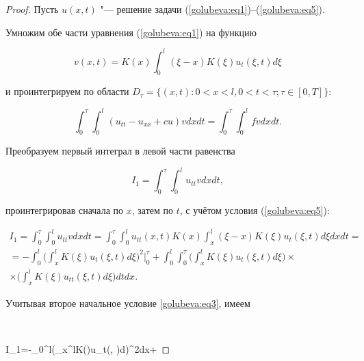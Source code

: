 \begin{proof}

Пусть $u(x, t)$ "--- решение задачи (\ref{golubeva:eq1})--(\ref{golubeva:eq5}).

Умножим обе части уравнения (\ref{golubeva:eq1}) на функцию

$$

v(x, t)=K(x)\int _{0}^{l}(\xi -x)K(\xi )u_{t}(\xi , t)d\xi

$$

и проинтегрируем по области $D_{\tau }=\{(x, t):0<x<l, 0<t<\tau; \tau \in [0, T]\}$:

\begin{equation}

\label{golubeva:eq7}

\int _{0}^{\tau }\int _{0}^{l}(u_{tt}-u_{xx}+cu)vdxdt=\int _{0}^{\tau }\int _{0}^{l}fvdxdt.

\end{equation}



Преобразуем первый интеграл в левой части равенства

$$

I_{1}=\int _{0}^{\tau }\int _{0}^{l}u_{tt}vdxdt,

$$

проинтегрировав сначала по $x$, затем по $t$, с учётом условия (\ref{golubeva:eq5}):

\begin{multline*}

I_{1}=\int _{0}^{\tau }\int _{0}^{l}u_{tt}vdxdt=\int _{0}^{\tau }\int _{0}^{l}u_{tt}(x, t)K(x)\int _{x}^{l}(\xi -x)K(\xi )u_{t}(\xi ,t)d\xi dxdt=\\

=-\int _{0}^{l}\biggl(\int _{x}^{l}K(\xi )u_{t}(\xi, t)d\xi \biggr)^{2}\Bigg|_{0}^{\tau }

+\int _{0}^{l}\int _{0}^{\tau }\biggl(\int _{x}^{l}K(\xi )u_{t}(\xi, t)d\xi \biggr)\times\\

\times\biggl(\int _{x}^{l}K(\xi )u_{tt}(\xi , t)d\xi \biggr)dtdx.

\end{multline*}



Учитывая второе начальное условие \eqref{golubeva:eq3}, имеем

$$

I_{1}=-\int _{0}^{l}\biggl(\int _{x}^{l}K(\xi )u_{t}(\xi , \tau )d\xi \biggr)^{2}dx+


\end{proof}
